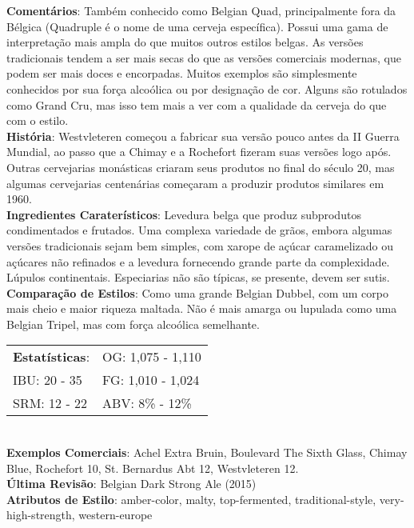 \textbf{Comentários}: Também conhecido como Belgian Quad, principalmente fora da Bélgica (Quadruple é o nome de uma cerveja específica). Possui uma gama de interpretação mais ampla do que muitos outros estilos belgas. As versões tradicionais tendem a ser mais secas do que as versões comerciais modernas, que podem ser mais doces e encorpadas. Muitos exemplos são simplesmente conhecidos por sua força alcoólica ou por designação de cor. Alguns são rotulados como Grand Cru, mas isso tem mais a ver com a qualidade da cerveja do que com o estilo. \\
\textbf{História}: Westvleteren começou a fabricar sua versão pouco antes da II Guerra Mundial, ao passo que a Chimay e a Rochefort fizeram suas versões logo após. Outras cervejarias monásticas criaram seus produtos no final do século 20, mas algumas cervejarias centenárias começaram a produzir produtos similares em 1960. \\
\textbf{Ingredientes Caraterísticos}: Levedura belga que produz subprodutos condimentados e frutados. Uma complexa variedade de grãos, embora algumas versões tradicionais sejam bem simples, com xarope de açúcar caramelizado ou açúcares não refinados e a levedura fornecendo grande parte da complexidade. Lúpulos continentais. Especiarias não são típicas, se presente, devem ser sutis. \\
\textbf{Comparação de Estilos}: Como uma grande Belgian Dubbel, com um corpo mais cheio e maior riqueza maltada. Não é mais amarga ou lupulada como uma Belgian Tripel, mas com força alcoólica semelhante. \\
\begin{tabular}{@{}p{35mm}p{35mm}@{}}
  \textbf{Estatísticas}: & OG: 1,075 - 1,110 \\
  IBU: 20 - 35  & FG: 1,010 - 1,024  \\
  SRM: 12 - 22  & ABV: 8\% - 12\%
\end{tabular}\\
\textbf{Exemplos Comerciais}: Achel Extra Bruin, Boulevard The Sixth Glass, Chimay Blue, Rochefort 10, St. Bernardus Abt 12, Westvleteren 12. \\
\textbf{Última Revisão}: Belgian Dark Strong Ale (2015) \\
\textbf{Atributos de Estilo}: amber-color, malty, top-fermented, traditional-style, very-high-strength, western-europe
